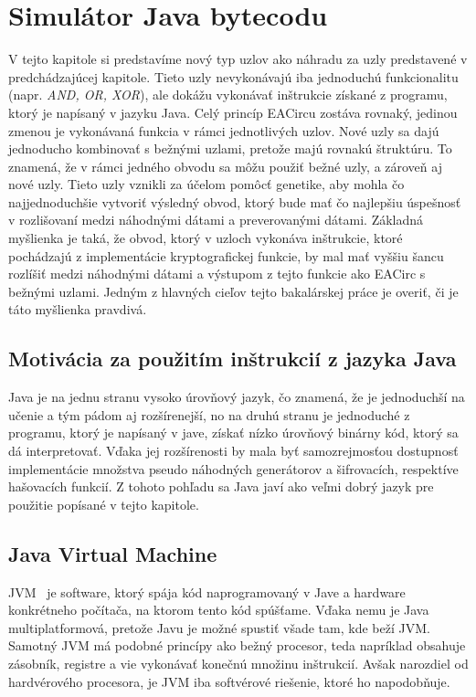 \chapter{Simulátor Java bytecodu}
\label{chap:eacirc-jvmsim}

V tejto kapitole si predstavíme nový typ uzlov ako náhradu za uzly predstavené v predchádzajúcej kapitole. Tieto uzly nevykonávajú iba jednoduchú funkcionalitu (napr. \textit{AND, OR, XOR}), ale dokážu vykonávať inštrukcie získané z programu, ktorý je napísaný v jazyku Java. Celý princíp EACircu zostáva rovnaký, jedinou zmenou je vykonávaná funkcia v rámci jednotlivých uzlov. Nové uzly sa dajú jednoducho kombinovať s bežnými uzlami, pretože majú rovnakú štruktúru. To znamená, že v rámci jedného obvodu sa môžu použiť bežné uzly, a zároveň aj nové uzly. Tieto uzly vznikli za účelom pomôcť genetike, aby mohla čo najjednoduchšie vytvoriť výsledný obvod, ktorý bude mať čo najlepšiu úspešnosť v rozlišovaní medzi náhodnými dátami a preverovanými dátami. Základná myšlienka je taká, že obvod, ktorý v uzloch vykonáva inštrukcie, ktoré pochádzajú z implementácie kryptografickej funkcie, by mal mať vyššiu šancu rozlíšiť medzi náhodnými dátami a výstupom z tejto funkcie ako EACirc s bežnými uzlami. Jedným z hlavných cieľov tejto bakalárskej práce je overiť, či je táto myšlienka pravdivá.

\section{Motivácia za použitím inštrukcií z jazyka Java}
\label{sec:java-bytecode}

Java je na jednu stranu vysoko úrovňový jazyk, čo znamená, že je jednoduchší na učenie a tým pádom aj rozšírenejší, no na druhú stranu je jednoduché z programu, ktorý je napísaný v jave, získať nízko úrovňový binárny kód, ktorý sa dá interpretovať. Vďaka jej rozšírenosti by mala byť samozrejmosťou dostupnosť implementácie množstva pseudo náhodných generátorov a šifrovacích, respektíve hašovacích funkcií. Z tohoto pohľadu sa Java javí ako veľmi dobrý jazyk pre použitie popísané v tejto kapitole.

\section{Java Virtual Machine}
\label{sec:jvm}

JVM~\parencite{JVM} je software, ktorý spája kód naprogramovaný v Jave a hardware konkrétneho počítača, na ktorom tento kód spúšťame. Vďaka nemu je Java multiplatformová, pretože Javu je možné spustiť všade tam, kde beží JVM. Samotný JVM má podobné princípy ako bežný procesor, teda napríklad obsahuje zásobník, registre a vie vykonávať konečnú množinu inštrukcií. Avšak narozdiel od hardvérového procesora, je JVM iba softvérové riešenie, ktoré ho napodobňuje.

